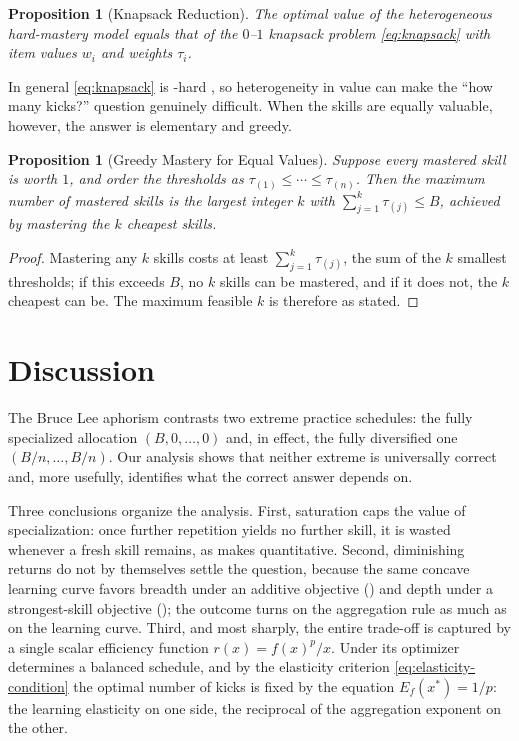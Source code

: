 \documentclass[11pt]{article}
\newtheorem{proposition}[theorem]{Proposition}
\theoremstyle{definition}
\theoremstyle{remark}
\newcommand{\eff}{r}
\newcommand{\elas}{E}
\begin{document}
\begin{proposition}[Knapsack Reduction]
\label{prop:knapsack}
The optimal value of the heterogeneous hard-mastery model equals that of the
\(0\)--\(1\) knapsack problem \eqref{eq:knapsack} with item values \(w_i\)
and weights \(\tau_i\).
\end{proposition}

In general \eqref{eq:knapsack} is \NP-hard \citep{martello1990knapsack},
so heterogeneity in value can make the ``how many kicks?'' question
genuinely difficult. When the skills are equally valuable, however, the
answer is elementary and greedy.

\begin{proposition}[Greedy Mastery for Equal Values]
\label{prop:greedy-threshold}
Suppose every mastered skill is worth \(1\), and order the thresholds as
\(\tau_{(1)}\leq\cdots\leq\tau_{(n)}\). Then the maximum number of mastered
skills is the largest integer \(k\) with
\(\sum_{j=1}^k \tau_{(j)}\leq B\), achieved by mastering the \(k\) cheapest
skills.
\end{proposition}

\begin{proof}
Mastering any \(k\) skills costs at least \(\sum_{j=1}^{k}\tau_{(j)}\), the
sum of the \(k\) smallest thresholds; if this exceeds \(B\), no \(k\) skills
can be mastered, and if it does not, the \(k\) cheapest can be. The maximum
feasible \(k\) is therefore as stated.
\end{proof}


\section{Discussion}
\label{sec:discussion}

The Bruce Lee aphorism contrasts two extreme practice schedules: the fully
specialized allocation \((B,0,\ldots,0)\) and, in effect, the fully
diversified one \((B/n,\ldots,B/n)\).  Our analysis shows that
neither extreme is universally correct and, more usefully, identifies
what the correct answer depends on.

Three conclusions organize the analysis. First, saturation caps the value
of specialization: once further repetition yields no further skill, it is
wasted whenever a fresh skill remains, as  makes
quantitative. Second, diminishing returns do not by themselves settle the
question, because the same concave learning curve favors breadth under an
additive objective () and depth under a
strongest-skill objective (); the outcome
turns on the aggregation rule as much as on the learning curve. Third, and
most sharply, the entire trade-off is captured by a single scalar
efficiency function \(\eff(x)=f(x)^p/x\). Under
 its optimizer determines a balanced schedule, and by
the elasticity criterion \eqref{eq:elasticity-condition} the optimal number
of kicks is fixed by the equation \(\elas_f(x^*)=1/p\): the learning
elasticity on one side, the reciprocal of the aggregation exponent on the
other.
\end{document}
